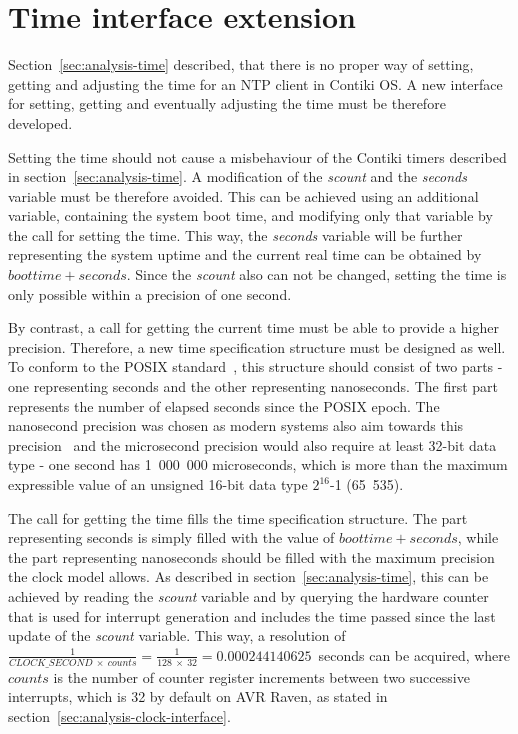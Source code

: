 
\section{Time interface extension}\label{sec:analysis-interface}
Section~\ref{sec:analysis-time} described, that there is no proper
way of setting, getting and adjusting the time for an NTP client in Contiki OS.
A new interface for setting, getting and eventually adjusting the time
must be therefore developed.

Setting the time should not cause a misbehaviour of the Contiki timers
described in section~\ref{sec:analysis-time}.
A modification of the {\it{scount}} and the {\it{seconds}} variable must be therefore avoided.
This can be achieved using an additional variable, containing the system boot time,
and modifying only that variable by the call for setting the time.
This way, the {\it{seconds}} variable will be further representing the system uptime
and the current real time can be obtained by $boottime + seconds$.
Since the {\it{scount}} also can not be changed, setting the time is only possible
within a precision of one second.

By contrast, a call for getting the current time must be able to provide a higher precision.
Therefore, a new time specification structure must be designed as well.
To conform to the POSIX standard~\cite{posix}, this structure should consist of two parts -
one representing seconds and the other representing nanoseconds.
The first part represents the number of elapsed seconds since the POSIX epoch.
The nanosecond precision was chosen as modern systems also aim towards this
precision~\cite{posix,ntp-precision} and
the microsecond precision would also require at least 32-bit data type -
one second has 1~000~000 microseconds, which is more than the maximum expressible value of
an unsigned 16-bit data type $2^{16}$-1 (65~535).

The call for getting the time fills the time specification structure.
The part representing seconds is simply filled with the value of $boottime + seconds$,
while the part representing nanoseconds should be filled with the maximum precision
the clock model allows.
As described in section~\ref{sec:analysis-time},
this can be achieved by reading the {\it{scount}} variable
and by querying the hardware counter that is used for
interrupt generation and includes the time passed since
the last update of the {\it{scount}} variable.
This way, a resolution of
$\frac{1}{CLOCK\_SECOND~\times~counts} = \frac{1}{128~\times~32} = 0.000244140625$~seconds
can be acquired,
where $counts$ is the number of counter register increments between two successive interrupts,
which is 32 by default on AVR Raven, as stated in section~\ref{sec:analysis-clock-interface}.

